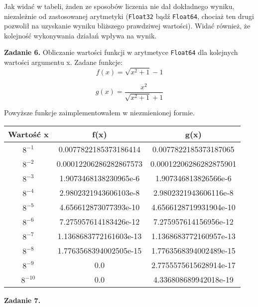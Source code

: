 \documentclass[15pt, a4paper]{article}
\begin{document}
\vspace{0.5cm}

Jak widać w tabeli, żaden ze sposobów liczenia nie dał dokładnego wyniku, niezależnie od zastosowanej arytmetyki (\verb|Float32| bądź \verb|Float64|, chociaż ten drugi pozwolił na uzyskanie wyniku bliższego prawdziwej wartości). Widać również, że kolejność wykonywania działań wpływa na wynik.

\vspace{0.5cm}

\noindent\hrulefill


\vspace{0.5cm}

\noindent\textbf{Zadanie 6.} Obliczanie wartości funkcji w arytmetyce \verb|Float64| dla kolejnych wartości argumentu x. Zadane funkcje:
\[
f(x) = \sqrt{x^2 + 1} - 1
\]

\[
g(x) = \frac{x^2}{\sqrt{x^2 + 1} + 1}
\]

Powyższe funkcje zaimplementowałem w niezmienionej formie.


\begin{table}[ht]
    \begin{tabular}{|c|c|c|}
        \hline 
        Wartość x & f(x) & g(x) \\ \hline
        $8^{\mathrm{-1}}$ & 0.0077822185373186414 & 0.0077822185373187065 \\ \hline
        $8^{\mathrm{-2}}$ & 0.00012206286282867573 & 0.00012206286282875901 \\ \hline
        $8^{\mathrm{-3}}$ & 1.9073468138230965e-6 & 1.907346813826566e-6 \\ \hline
        $8^{\mathrm{-4}}$ & 2.9802321943606103e-8 & 2.9802321943606116e-8 \\ \hline
        $8^{\mathrm{-5}}$ & 4.656612873077393e-10 & 4.6566128719931904e-10 \\ \hline
        $8^{\mathrm{-6}}$ & 7.275957614183426e-12 & 7.275957614156956e-12 \\ \hline
        $8^{\mathrm{-7}}$ & 1.1368683772161603e-13 & 1.1368683772160957e-13 \\ \hline
        $8^{\mathrm{-8}}$ & 1.7763568394002505e-15 & 1.7763568394002489e-15 \\ \hline
        $8^{\mathrm{-9}}$ & 0.0 & 2.7755575615628914e-17 \\ \hline
        $8^{\mathrm{-10}}$ & 0.0 & 4.336808689942018e-19 \\ \hline
    \end{tabular}
    \label{tab:fvsg}
\end{table}



\vspace{0.5cm}

\noindent\hrulefill


\vspace{0.5cm}

\noindent\textbf{Zadanie 7.} 
\end{document}
